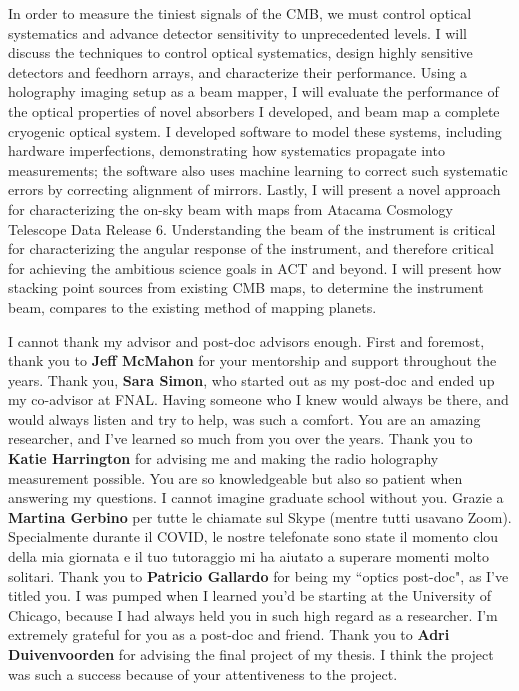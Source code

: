 \documentclass{ucetd}
\begin{document}
In order to measure the tiniest signals of the CMB, we must control optical systematics and advance detector sensitivity to unprecedented levels. I will discuss the techniques to control optical systematics, design highly sensitive detectors and feedhorn arrays, and characterize their performance. Using a holography imaging setup as a beam mapper, I will evaluate the performance of the optical properties of novel absorbers I developed, and beam map a complete cryogenic optical system. I developed software to model these systems,  including hardware imperfections, demonstrating how systematics propagate into measurements; the software also uses machine learning to correct such systematic errors by correcting alignment of mirrors.  Lastly, I will present a novel approach for characterizing the on-sky beam with maps from Atacama Cosmology Telescope Data Release 6.  Understanding the beam of the instrument is critical for characterizing the angular response of the instrument, and therefore critical for achieving the ambitious science goals in ACT and beyond.  I will present how stacking point sources from existing CMB maps, to determine the instrument beam, compares to the existing method of mapping planets.

\mainmatter











\appendix






\acknowledgments



I cannot thank my advisor and post-doc advisors enough.  First and foremost, thank you to \textbf{Jeff McMahon} for your mentorship and support throughout the years.  Thank you, \textbf{Sara Simon}, who started out as my post-doc and ended up my co-advisor at FNAL.  Having someone who I knew would always be there, and would always listen and try to help, was such a comfort.  You are an amazing researcher, and I've learned so much from you over the years.  Thank you to \textbf{Katie Harrington} for advising me and making the radio holography measurement possible.  You are so knowledgeable but also so patient when answering my questions.  I cannot imagine graduate school without you.  Grazie a \textbf{Martina Gerbino} per tutte le chiamate sul Skype (mentre tutti usavano Zoom).  Specialmente durante il COVID, le nostre telefonate sono state il momento clou della mia giornata e il tuo tutoraggio mi ha aiutato a superare momenti molto solitari.  Thank you to \textbf{Patricio Gallardo} for being my ``optics post-doc", as I've titled you.  I was pumped when I learned you'd be starting at the University of Chicago, because I had always held you in such high regard as a researcher.  I'm extremely grateful for you as a post-doc and friend.  Thank you to \textbf{Adri Duivenvoorden} for advising the final project of my thesis.  I think the project was such a success because of your attentiveness to the project.
\end{document}
